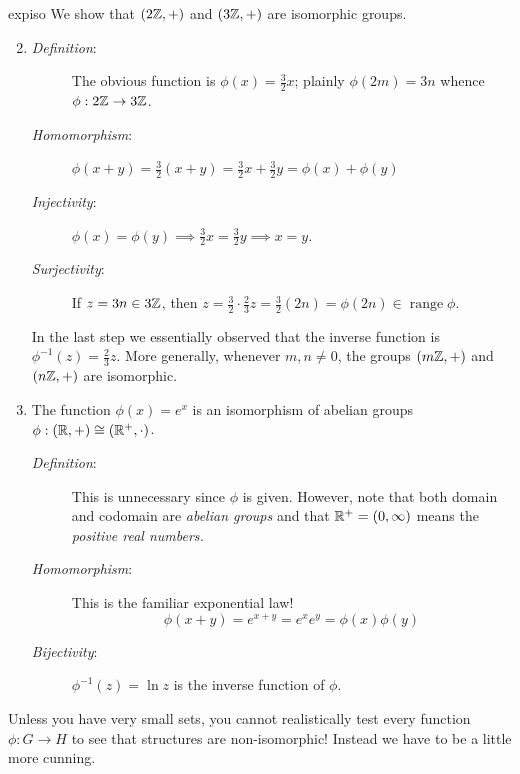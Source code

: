 \begin{examples}{}{expiso}
\exstart We show that $(2\mathbb{Z},+)$ and $(3\mathbb{Z},+)$ are isomorphic groups.\vspace{-2pt}
\begin{enumerate}\setcounter{enumi}{1}
  \item[]\begin{description}
  	\item[\normalfont\emph{Definition}:] The obvious function is $\phi(x)=\frac 32x$; plainly $\phi(2m)=3n$ whence $\phi:2\mathbb{Z}\to 3\mathbb{Z}$.
  	\item[\normalfont\emph{Homomorphism}:] $\phi(x+y)=\frac 32(x+y)=\frac 32x+\frac 32y=\phi(x)+\phi(y)$
  	\item[\normalfont\emph{Injectivity}:] $\phi(x)=\phi(y)\implies \frac 32x=\frac 32y\implies x=y$.
  	\item[\normalfont\emph{Surjectivity}:] If $z=3n\in 3\mathbb{Z}$, then $z=\frac 32\cdot\frac 23z=\frac 32(2n)=\phi(2n)\in\operatorname{range}\phi$.
	\end{description}
	In the last step we essentially observed that the inverse function is $\phi^{-1}(z)=\frac 23z$.\medbreak
	More generally, whenever $m,n\neq 0$, the groups $(m\mathbb{Z},+)$ and $(n\mathbb{Z},+)$ are isomorphic. 

	\item\label{ex:expiso1}	The function $\phi(x)=e^x$ is an isomorphism of abelian groups $\phi:(\mathbb{R},+)\cong(\mathbb{R}^+,\cdot)$.\vspace{-2pt}
	\begin{description}%
  	\item[\normalfont\emph{Definition}:] This is unnecessary since $\phi$ is given. However, note that both domain and codomain are \emph{abelian groups} and that $\mathbb{R}^+=(0,\infty)$ means the \emph{positive real numbers.}
  	\item[\normalfont\emph{Homomorphism}:] This is the familiar exponential law!
  	\[\phi(x+y)=e^{x+y}=e^xe^y=\phi(x)\phi(y)\]
  	\item[\normalfont\emph{Bijectivity}:] $\phi^{-1}(z)=\ln z$ is the inverse function of $\phi$.
	\end{description}
\end{enumerate}
\end{examples}




Unless you have very small sets, you cannot realistically test every function $\phi:G\to H$ to see that structures are non-isomorphic! Instead we have to be a little more cunning.

